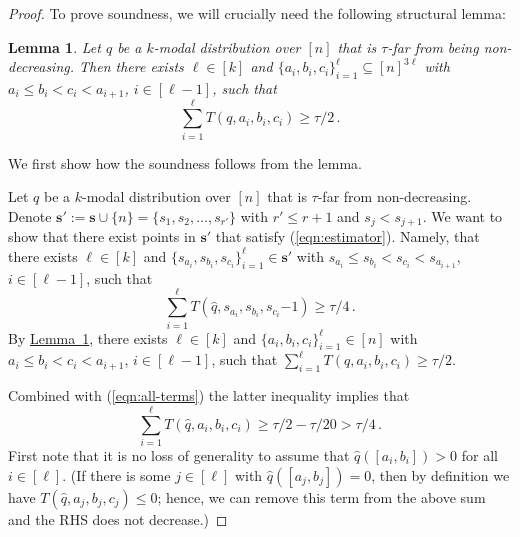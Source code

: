 \documentclass[10pt]{article}
\newtheorem{lemma}[theorem]{Lemma}
\theoremstyle{definition}
\numberwithin{equation}{section}
\newcommand{\expref}[2]{\texorpdfstring{\hyperref[#2]{#1~\ref{#2}}}{#1~\ref{#2}}}
\newcommand{\wh}[1]{{\widehat{#1}}}
\begin{document}
\begin{proof}
%
%

%

%
%

To prove soundness, we will crucially need the following structural lemma:
\begin{lemma} \label{lem:tau-far-structure}
Let $q$ be a $k$-modal distribution over $[n]$ that is $\tau$-far from being non-decreasing. Then \emph{there exists} 
$\ell \in [k]$ and $\{a_i, b_i, c_i\}_{i=1}^{\ell} \subseteq [n]^{3\ell}$ with $a_i \le b_i < c_i < a_{i+1}$, $i \in [\ell-1]$, such that 
\begin{equation} \label{eqn:str}
\sum_{i=1}^{\ell} T(q, a_i, b_i, c_i) \ge \tau/2\,.
\end{equation}


\end{lemma}

We first show how the soundness  follows from the lemma.
{Let $q$ be a $k$-modal distribution over $[n]$ that is $\tau$-far from non-decreasing.
Denote $\mathbf{s}' := \mathbf{s} \cup \{n\} = \{s_1, s_2, \ldots, s_{r'}\}$ with $r' \le r+1$ and 
$s_j < s_{j+1}$. We want to show that there exist points in $\mathbf{s}'$ that satisfy (\ref{eqn:estimator}). Namely, that
there exists $\ell \in [k]$ and $\{ s_{a_i}, s_{b_i}, s_{c_i} \}_{i=1}^{\ell} \in \mathbf{s}'$ with $s_{a_i} \le s_{b_i} < s_{c_i} < s_{a_{i+1}}$, $i \in [\ell-1]$, 
such that
\begin{equation} \label{eqn:final-goal2}
\sum_{i=1}^{\ell} T(\wh{q}, s_{a_i}, s_{b_i}, s_{c_i}  {-1}) \ge \tau/4\,.
\end{equation}
By \expref{Lemma}{lem:tau-far-structure}, there exists
$\ell \in [k]$ and $\{a_i, b_i, c_i\}_{i=1}^{\ell} \in [n]$ with $a_i \le b_i < c_i < a_{i+1}$, $i \in [\ell-1]$, 
such that $\sum_{i=1}^{\ell} T(q, a_i, b_i, c_i) \ge \tau/2$.  
 {Combined with (\ref{eqn:all-terms}) the latter {inequality} 
implies that
\begin{equation} \label{eqn:sound}
\sum_{i=1}^{\ell} T(\wh{q}, a_i, b_i, c_i) \ge \tau/2 - \tau/20 > \tau/4\,.
\end{equation} 
First note that it is no loss of generality to assume that $\wh{q}([a_i, b_i])>0$ for all $i \in [\ell]$.
(If there is some $j \in [\ell]$ with $\wh{q}([a_j, b_j])=0$, then by definition we have $T(\wh{q}, a_j, b_j, c_j) \le 0$; hence, 
we can remove this term from the above sum and the RHS does not decrease.)

}}
\end{proof}
\end{document}
